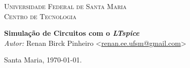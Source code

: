 \begin{titlepage}
\begin{center}

\textsc{\LARGE Universidade Federal de Santa Maria}\\[1.5cm]
\textsc{\Large Centro de Tecnologia}\\[0.5cm]

\end{center}

\vspace*{5cm}
\begin{center}
{\huge \bfseries Simulação de Circuitos com o \textit{LTspice}}\\[0.4cm]
\vspace*{130px}
\emph{Autor:}
Renan Birck Pinheiro <\url{renan.ee.ufsm@gmail.com}>


Santa Maria, \today.
\end{center}




\end{titlepage}
